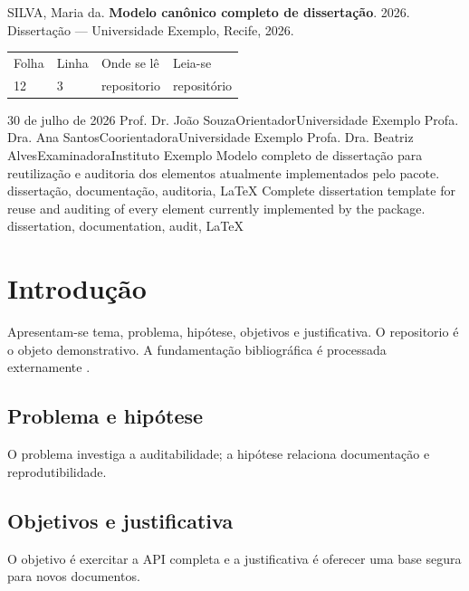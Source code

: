 \documentclass[12pt]{report}
\begin{document}
\ABNTEXacademicoexterna
{}

\ABNTEXacademicopretextual
\ABNTEXfolhaderosto
{}
\ABNTEXerrata
  {SILVA, Maria da. \textbf{Modelo canônico completo de dissertação}.
   2026. Dissertação — Universidade Exemplo, Recife, 2026.}
  {\begin{center}
     \begin{tabular}{llll}
       Folha & Linha & Onde se lê & Leia-se\\
       12 & 3 & repositorio & repositório
     \end{tabular}
   \end{center}}
\ABNTEXfolhadeaprovacao
  {30 de julho de 2026}
  {%
    \ABNTEXmembrobanca
      {Prof. Dr. João Souza}{Orientador}{Universidade Exemplo}
    \ABNTEXmembrobanca
      {Profa. Dra. Ana Santos}{Coorientadora}{Universidade Exemplo}
    \ABNTEXmembrobanca
      {Profa. Dra. Beatriz Alves}{Examinadora}{Instituto Exemplo}
  }
\ABNTEXresumo
  {Modelo completo de dissertação para reutilização e auditoria dos elementos
   atualmente implementados pelo pacote.}
  {dissertação, documentação, auditoria, LaTeX}
\ABNTEXresumoemlinguaestrangeira
  {Complete dissertation template for reuse and auditing of every element
   currently implemented by the package.}
  {dissertation, documentation, audit, LaTeX}
\ABNTEXlistadeilustracoes
\ABNTEXlistadetabelas
\ABNTEXlistadeabreviaturasesiglas
\ABNTEXlistadesimbolos
\ABNTEXsumario

\ABNTEXacademicotextual
\chapter{Introdução}
Apresentam-se tema, problema, hipótese, objetivos e justificativa. O
\gls{repositorio} é o objeto demonstrativo. A fundamentação bibliográfica é
processada externamente \parencite{associacao2025}.
\section{Problema e hipótese}
O problema investiga a auditabilidade; a hipótese relaciona documentação e
reprodutibilidade.
\section{Objetivos e justificativa}
O objetivo é exercitar a API completa e a justificativa é oferecer uma base
segura para novos documentos.
\end{document}
